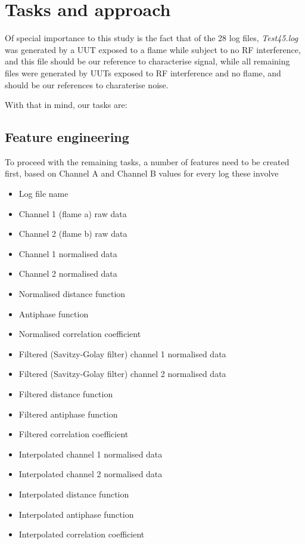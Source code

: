 \section{Tasks and approach}

Of special importance to this study is the fact that of the 28 log files, \textit{Test45.log} was generated by a UUT exposed to a flame while subject to no RF interference, and this file should be our reference to characterise signal, while all remaining files were generated by UUTs exposed to RF interference and no flame, and should be our references to charaterise noise.

With that in mind, our tasks are:

\subsection{Feature engineering}

To proceed with the remaining tasks, a number of features need to be created first, based on Channel A and Channel B values for every log these involve

\begin{itemize}
    \item Log file name
    \item Channel 1 (flame a) raw data
    \item Channel 2 (flame b) raw data
    \item Channel 1 normalised data
    \item Channel 2 normalised data
    \item Normalised distance function
    \item Antiphase function
    \item Normalised correlation coefficient
    \item Filtered (Savitzy-Golay filter) channel 1 normalised data
    \item Filtered (Savitzy-Golay filter) channel 2 normalised data
    \item Filtered distance function
    \item Filtered antiphase function
    \item Filtered correlation coefficient
    \item Interpolated channel 1 normalised data
    \item Interpolated channel 2 normalised data
    \item Interpolated distance function
    \item Interpolated antiphase function
    \item Interpolated correlation coefficient
\end{itemize}

